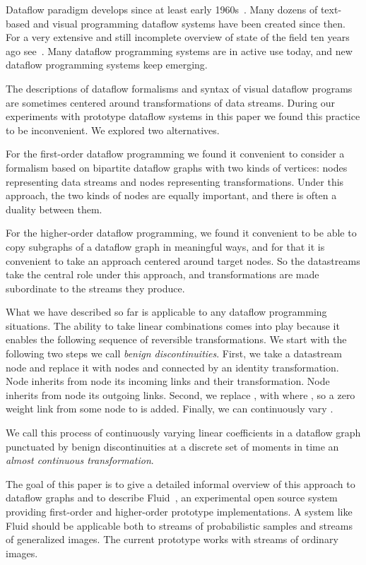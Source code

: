 \documentclass{llncs}
\begin{document}
Dataflow paradigm develops since at least early 1960s~\cite{JKellyLochbaumVyssotsky}. Many dozens of text-based and visual programming
dataflow systems have been created since then. For a very extensive and still incomplete overview of state of the field ten years ago see~\cite{WJohnstonHannaMillar}.
Many dataflow programming systems are in active use today, and new dataflow programming systems keep emerging.

The descriptions of dataflow formalisms and syntax of visual dataflow programs are sometimes centered around transformations of data streams. 
During our experiments with prototype dataflow systems in this paper we found this practice to be inconvenient. We explored two alternatives.

For the first-order dataflow programming we found it convenient to consider a formalism based on bipartite dataflow graphs with two kinds of
vertices:  nodes representing data streams and nodes representing transformations. Under this approach, the two kinds of nodes are equally
important, and there is often a duality between them.

For the higher-order dataflow programming, we found it convenient to be able to copy subgraphs of a dataflow graph in meaningful ways, and
for that it is convenient to take an approach centered around target nodes. So the datastreams take the central role under this approach, 
and transformations are made subordinate to the streams they produce.

What we have described so far is applicable to any dataflow programming situations. The ability to take linear combinations comes into play
because it enables the following sequence of reversible transformations. We start with the following two steps we call {\em benign discontinuities}. First,
we take a datastream node  and replace it with nodes  and  connected by an identity transformation. Node  inherits from node  its
incoming links and their transformation. Node  inherits from node  its outgoing links. Second, we replace , with
 where , so a zero weight link from some node  to  is added. Finally, we can continuously
vary . 

We call this process of continuously varying linear coefficients in a dataflow graph punctuated by benign discontinuities at a discrete set of moments in time 
an {\em almost continuous transformation}.

The goal of this paper is to give a detailed informal overview of this approach to dataflow graphs and to describe Fluid~\cite{Fluid}, an experimental open source system
providing first-order and higher-order prototype implementations. A system like Fluid should be applicable both to streams of probabilistic samples and
streams of generalized images. The current prototype works with streams of ordinary images.
\end{document}
